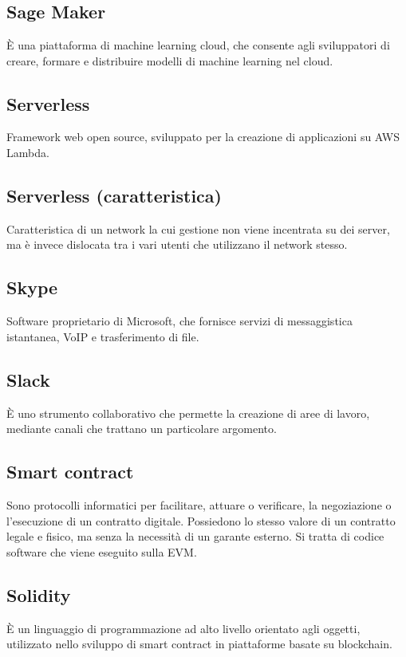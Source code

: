 \section[S]{}
	\subsection*{Sage Maker}
	È una piattaforma di machine learning cloud, che consente agli sviluppatori di creare, formare e distribuire modelli di machine learning nel cloud.
	\subsection*{Serverless}
	Framework web open source, sviluppato per la creazione di applicazioni su AWS Lambda.
	\subsection*{Serverless (caratteristica)}
	Caratteristica di un network la cui gestione non viene incentrata su dei server, ma è invece dislocata tra i vari utenti che utilizzano il network stesso.
	\subsection*{Skype}
	Software proprietario di Microsoft, che fornisce servizi di messaggistica istantanea, VoIP e trasferimento di file.
	\subsection*{Slack}
	È uno strumento collaborativo che permette la creazione di aree di lavoro, mediante canali che trattano un particolare argomento.
	\subsection*{Smart contract}
	Sono protocolli informatici per facilitare, attuare o verificare, la negoziazione o l’esecuzione di un contratto digitale. Possiedono lo stesso valore di un contratto legale e fisico, ma senza la necessità di un garante esterno. Si tratta di codice software che viene eseguito sulla EVM.
	\subsection*{Solidity}
	È un linguaggio di programmazione ad alto livello orientato agli oggetti, utilizzato nello sviluppo di smart contract in piattaforme basate su blockchain.
